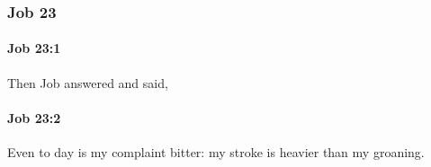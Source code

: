 	\subsubsection{Job 23} %
		\label{JOB-23}

		\paragraph{Job 23:1} %
			\label{JOB-23-1}

			Then Job answered and said,


		\paragraph{Job 23:2} %
			\label{JOB-23-2}

			Even to day is my complaint bitter: my stroke is heavier than my groaning.


